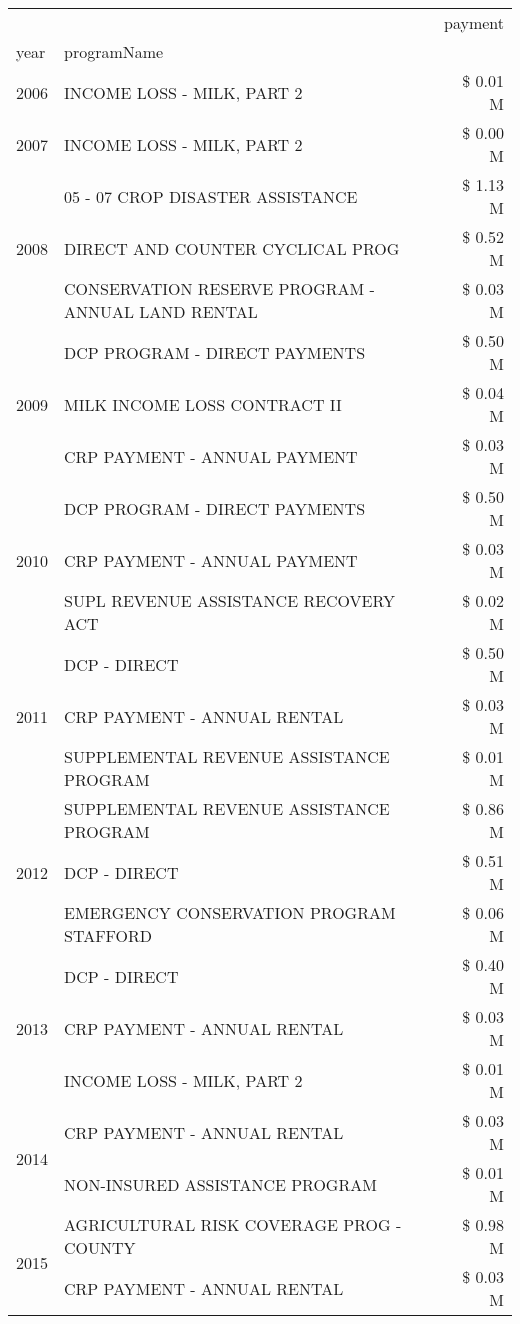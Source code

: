 \begin{tabular}{llr}
\toprule
 &  & payment \\
year & programName &  \\
\midrule
2006 & INCOME LOSS - MILK, PART 2 & \$ 0.01 M \\
\cline{1-3}
2007 & INCOME LOSS - MILK, PART 2 & \$ 0.00 M \\
\cline{1-3}
\multirow[t]{3}{*}{2008} & 05 - 07 CROP DISASTER ASSISTANCE & \$ 1.13 M \\
 & DIRECT AND COUNTER CYCLICAL PROG & \$ 0.52 M \\
 & CONSERVATION RESERVE PROGRAM - ANNUAL LAND RENTAL & \$ 0.03 M \\
\cline{1-3}
\multirow[t]{3}{*}{2009} & DCP PROGRAM - DIRECT PAYMENTS & \$ 0.50 M \\
 & MILK INCOME LOSS CONTRACT II & \$ 0.04 M \\
 & CRP PAYMENT - ANNUAL PAYMENT & \$ 0.03 M \\
\cline{1-3}
\multirow[t]{3}{*}{2010} & DCP PROGRAM - DIRECT PAYMENTS & \$ 0.50 M \\
 & CRP PAYMENT - ANNUAL PAYMENT & \$ 0.03 M \\
 & SUPL REVENUE ASSISTANCE RECOVERY ACT & \$ 0.02 M \\
\cline{1-3}
\multirow[t]{3}{*}{2011} & DCP - DIRECT & \$ 0.50 M \\
 & CRP PAYMENT - ANNUAL RENTAL & \$ 0.03 M \\
 & SUPPLEMENTAL REVENUE ASSISTANCE PROGRAM & \$ 0.01 M \\
\cline{1-3}
\multirow[t]{3}{*}{2012} & SUPPLEMENTAL REVENUE ASSISTANCE PROGRAM & \$ 0.86 M \\
 & DCP - DIRECT & \$ 0.51 M \\
 & EMERGENCY CONSERVATION PROGRAM STAFFORD & \$ 0.06 M \\
\cline{1-3}
\multirow[t]{3}{*}{2013} & DCP - DIRECT & \$ 0.40 M \\
 & CRP PAYMENT - ANNUAL RENTAL & \$ 0.03 M \\
 & INCOME LOSS - MILK, PART 2 & \$ 0.01 M \\
\cline{1-3}
\multirow[t]{2}{*}{2014} & CRP PAYMENT - ANNUAL RENTAL & \$ 0.03 M \\
 & NON-INSURED ASSISTANCE PROGRAM & \$ 0.01 M \\
\cline{1-3}
\multirow[t]{3}{*}{2015} & AGRICULTURAL RISK COVERAGE PROG - COUNTY & \$ 0.98 M \\
 & CRP PAYMENT - ANNUAL RENTAL & \$ 0.03 M \\

\end{tabular}
